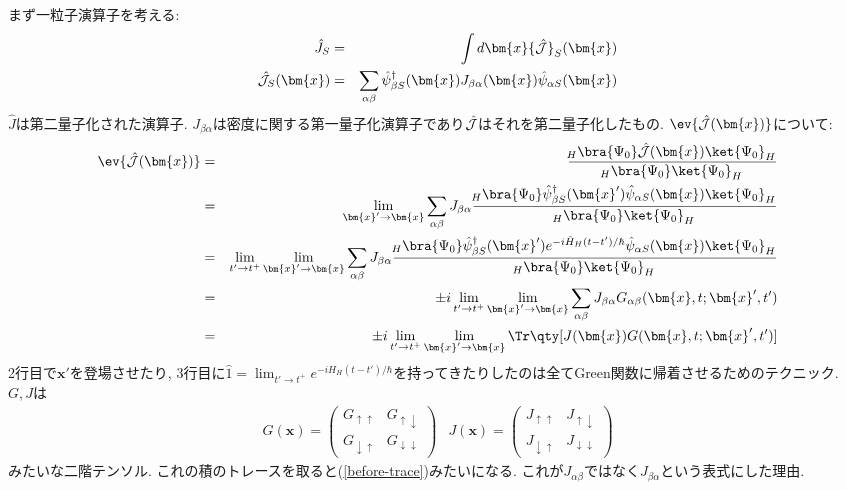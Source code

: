 \documentclass[10.5pt,a4paper]{jreport}
\begin{document}
まず一粒子演算子を考える:
\begin{eqnarray}
  \hat{J}_S &=& \int d\bm{x} {\cal \hat{J}}_S(\bm{x})\\
  \hat{{\cal J}}_S(\bm{x}) &=& \sum_{\alpha\beta}\hat{\psi}_{\beta S}^\dagger(\bm{x})J_{\beta\alpha}(\bm{x})\hat{\psi}_{\alpha S}(\bm{x})
\end{eqnarray}
$\hat{J}$は第二量子化された演算子. $J_{\beta\alpha}$は密度に関する第一量子化演算子であり$\hat{{\cal J}}$はそれを第二量子化したもの. $\ev{\hat{\cal{J}}(\bm{x})}$について:
\begin{eqnarray}
  \ev{\hat{\cal J}(\bm{x})} &=& \frac{\!_H\bra{\Psi_0}\hat{\cal J}(\bm{x})\ket{\Psi_0}_H}{\!_H\bra{\Psi_0}\ket{\Psi_0}_H} \\
  &=& \lim_{\bm{x}'\rightarrow\bm{x}}\sum_{\alpha\beta}J_{\beta\alpha}\frac{\!_H\bra{\Psi_0}\hat{\psi}^\dagger_{\beta S}(\bm{x}')\hat{\psi}_{\alpha S}(\bm{x})\ket{\Psi_0}_H}{\!_H\bra{\Psi_0}\ket{\Psi_0}_H} \\
  &=& \lim_{t'\rightarrow t^+}\lim_{\bm{x}'\rightarrow\bm{x}}\sum_{\alpha\beta}J_{\beta\alpha}\frac{\!_H\bra{\Psi_0}\hat{\psi}^\dagger_{\beta S}(\bm{x}')e^{-i\hat{H}_H(t-t')/\hbar}\hat{\psi}_{\alpha S}(\bm{x})\ket{\Psi_0}_H}{\!_H\bra{\Psi_0}\ket{\Psi_0}_H} \\
  &=& \pm i\lim_{t'\rightarrow t^+}\lim_{\bm{x}'\rightarrow\bm{x}}\sum_{\alpha\beta}J_{\beta\alpha}G_{\alpha\beta}(\bm{x}, t; \bm{x}', t')\label{before-trace}\\
  &=& \pm i\lim_{t'\rightarrow t^+}\lim_{\bm{x}'\rightarrow\bm{x}}\Tr\qty[J(\bm{x})G(\bm{x}, t; \bm{x}', t')]
\end{eqnarray}
2行目で$\bm{x}'$を登場させたり, 3行目に$\hat{1} = \lim_{t'\rightarrow t^+}e^{-iH_H(t - t')/\hbar}$を持ってきたりしたのは全てGreen関数に帰着させるためのテクニック. $G, J$は
\begin{eqnarray}
  G(\bm{x}) =
  \begin{pmatrix}
    G_{\uparrow\uparrow} & G_{\uparrow\downarrow}\\
    G_{\downarrow\uparrow} & G_{\downarrow\downarrow}
  \end{pmatrix} &  J(\bm{x}) =
  \begin{pmatrix}
    J_{\uparrow\uparrow} & J_{\uparrow\downarrow}\\
    J_{\downarrow\uparrow} & J_{\downarrow\downarrow}
  \end{pmatrix}
\end{eqnarray}
みたいな二階テンソル. これの積のトレースを取ると(\ref{before-trace})みたいになる. これが$J_{\alpha\beta}$ではなく$J_{\beta\alpha}$という表式にした理由.
\end{document}
